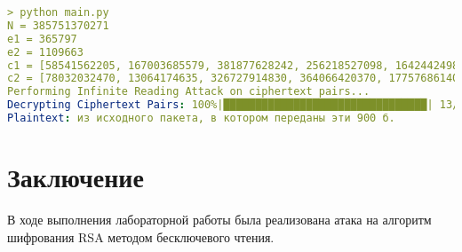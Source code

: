 \documentclass[a4paper, 14pt]{report}
\begin{document}
\begin{lstlisting}[language=YAML, caption=Вывод в консоль]
> python main.py
N = 385751370271
e1 = 365797
e2 = 1109663
c1 = [58541562205, 167003685579, 381877628242, 256218527098, 164244249864, 6588741823, 180308234660, 174572441677, 259951955034, 378589342820, 319378579620, 21405495597, 226860843155]
c2 = [78032032470, 13064174635, 326727914830, 364066420370, 177576861402, 65863828523, 111437045566, 124743274954, 119577259869, 85769669875, 4688914942, 261002397567, 341722428571]
Performing Infinite Reading Attack on ciphertext pairs...
Decrypting Ciphertext Pairs: 100%|████████████████████████████████| 13/13 [00:00<00:00, 53667.28it/s]
Plaintext: из исходного пакета, в котором переданы эти 900 б.
\end{lstlisting}
\chapter*{Заключение}
{}
В ходе выполнения лабораторной работы была реализована атака на алгоритм шифрования RSA методом бесключевого чтения.
\end{document}
